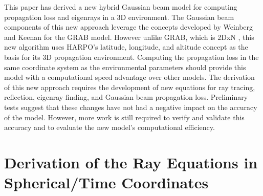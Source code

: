 \documentclass{ws-jca}
\newcommand{\threeD}{3\nobreakdash\textendash D }	%
\newcommand{\twoDxN}{2\nobreakdash\textendash DxN }
\begin{document}
This paper has derived a new hybrid Gaussian beam model for computing
propagation loss and eigenrays in a \threeD environment. The Gaussian beam
components of this new approach leverage the concepts developed by Weinberg
and Keenan for the GRAB model. However unlike GRAB, which is \twoDxN, this
new algorithm uses HARPO's latitude, longitude, and altitude concept as the
basis for its \threeD propagation environment. Computing the propagation
loss in the same coordinate system as the environmental parameters should
provide this model with a computational speed advantage over other models.
The derivation of this new approach requires the development of new
equations for ray tracing, reflection, eigenray finding, and Gaussian beam
propagation loss. Preliminary tests suggest that these changes have not had
a negative impact on the accuracy of the model. However, more work is still
required to verify and validate this accuracy and to evaluate the new
model's computational efficiency.

\appendix

\section{Derivation of the Ray Equations in Spherical/Time Coordinates}
\end{document}
